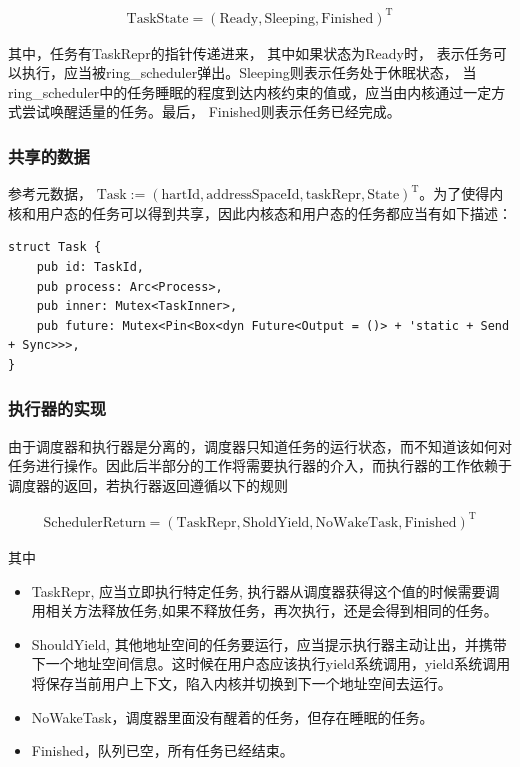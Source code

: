 \begin{equation}
    \label{equation:c3taskstate}
    \begin{aligned}
\boldsymbol{\mathrm{TaskState}} = (\mathrm{Ready}, \mathrm{Sleeping}, \mathrm{Finished})^{\boldsymbol{\mathrm{T}}}
    \end{aligned}
\end{equation}

其中，任务有TaskRepr的指针传递进来， 其中如果状态为Ready时， 表示任务可以执行，应当被ring\_scheduler弹出。Sleeping则表示任务处于休眠状态， 当ring\_scheduler中的任务睡眠的程度到达内核约束的值或，应当由内核通过一定方式尝试唤醒适量的任务。最后， Finished则表示任务已经完成。

\subsubsection{共享的数据}

参考元数据， $\boldsymbol{\mathrm{Task}} := (\mathrm{hartId}, \mathrm{addressSpaceId}, \mathrm{taskRepr}, \mathrm{State})^{\mathrm{T}}$。为了使得内核和用户态的任务可以得到共享，因此内核态和用户态的任务都应当有如下描述：

\begin{lstlisting}
struct Task {
    pub id: TaskId,
    pub process: Arc<Process>,
    pub inner: Mutex<TaskInner>,
    pub future: Mutex<Pin<Box<dyn Future<Output = ()> + 'static + Send + Sync>>>, 
}
\end{lstlisting}

\subsubsection{执行器的实现}

由于调度器和执行器是分离的，调度器只知道任务的运行状态，而不知道该如何对任务进行操作。因此后半部分的工作将需要执行器的介入，而执行器的工作依赖于调度器的返回，若执行器返回遵循以下的规则

\begin{equation}
    \label{equation:c3schedulerreturn}
    \begin{aligned}
\boldsymbol{\mathrm{SchedulerReturn}} = (\mathrm{TaskRepr}, \mathrm{SholdYield}, \mathrm{NoWakeTask}, \mathrm{Finished})^{\mathrm{T}}
    \end{aligned}
\end{equation}

其中

\begin{itemize}
    \item TaskRepr, 应当立即执行特定任务, 执行器从调度器获得这个值的时候需要调用相关方法释放任务,如果不释放任务，再次执行，还是会得到相同的任务。
    \item ShouldYield, 其他地址空间的任务要运行，应当提示执行器主动让出，并携带下一个地址空间信息。这时候在用户态应该执行yield系统调用，yield系统调用将保存当前用户上下文，陷入内核并切换到下一个地址空间去运行。
    \item  NoWakeTask，调度器里面没有醒着的任务，但存在睡眠的任务。
    \item  Finished，队列已空，所有任务已经结束。
\end{itemize}


